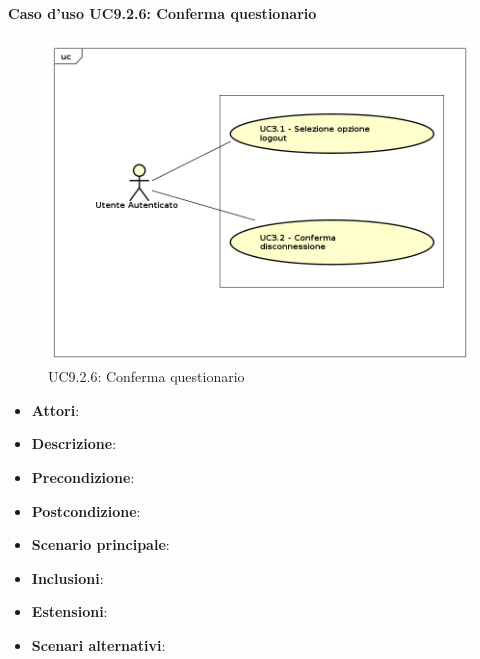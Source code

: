 		\paragraph{Caso d'uso UC9.2.6: Conferma questionario}
		\label{UC9.2.6}
		\begin{figure}[h]
			\centering
		\includegraphics[scale=0.7,keepaspectratio]{UML/UC9.png}
			\caption{UC9.2.6: Conferma questionario}
		\end{figure}
		\FloatBarrier
		\begin{itemize}
			\item \textbf{Attori}: 
			\item \textbf{Descrizione}: 
			\item \textbf{Precondizione}: 
			\item \textbf{Postcondizione}: 
			\item \textbf{Scenario principale}:
			\item \textbf{Inclusioni}:
			\item \textbf{Estensioni}:
			\item \textbf{Scenari alternativi}:
		\end{itemize}
		
